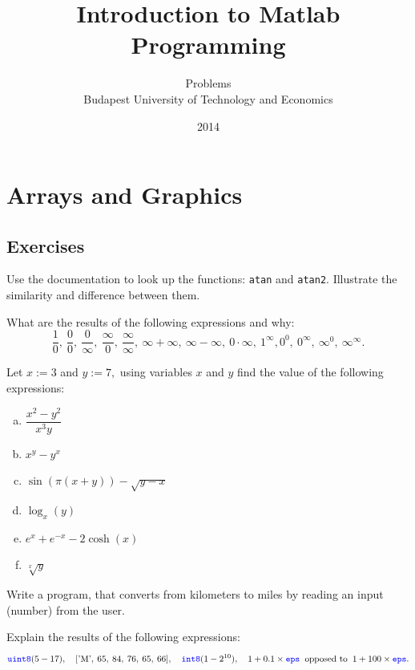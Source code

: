 \documentclass[a4paper, fleqn, 10pt]{report}
\title{Introduction to Matlab Programming}
\author{Problems \\[2em] Budapest University of Technology and Economics}
\date{2014}
\theoremstyle{definition}
\newenvironment{prb*}[1]
  {\renewcommand\theprb{\thechapter.\arabic{prb}\rlap{$^{#1}$}}\prb}
  {\endprb}
\newcommand{\mc}[1]{{\color{Blue}\tt #1}}
\DeclareMathOperator{\ch}{cosh}
\begin{document}
\maketitle
\chapter{Arrays and Graphics}
\section{Exercises}
\begin{prb*}{1}
Use the documentation to look up the functions: \mc{atan} and \mc{atan2}.
Illustrate the similarity and difference between them.
\end{prb*}


\begin{prb*}{1}
What are the results of the following expressions and why:
\[\frac{1}{0},\: \frac{0}{0},\: \frac{0}{\infty},\: \frac{\infty}{0},\: \frac{\infty}{\infty},\: \infty + \infty,\: \infty - \infty,\: 0\cdot\infty, \: 1^\infty, 0^0,\: 0^\infty,\: \infty^0,\: \infty^\infty.\]
\end{prb*}

\begin{prb*}{1}
Let $x:=3$ and $y:=7,$ using variables $x$ and $y$ find the value of the following expressions:
\begin{multicols}{3}
\begin{enumerate}[a)]
 \item $\dfrac{x^2-y^2}{x^3y}$
 \item $x^y-y^x$
 \item $\sin(\pi(x+y)) - \sqrt{y-x}$
 \item $\log_x(y)$
 \item $e^x + e^{-x} - 2\ch(x)$
 \item $\sqrt[x]{y}$
\end{enumerate}
\end{multicols}
\end{prb*}

\begin{prb*}{1}
Write a program, that converts from kilometers to miles by reading an input (number) from the user.
\end{prb*}

\begin{prb*}{1}
Explain the results of the following expressions:
\[\mc{uint8}(5-17), \quad [\text{'M'},\: 65,\: 84,\: 76,\: 65,\: 66], \quad \mc{int8}(1-2^{10}), \quad 1+0.1\times\mc{eps}\: \text{ opposed to }\: 1+100\times\mc{eps}.\]
\end{prb*}
\end{document}
